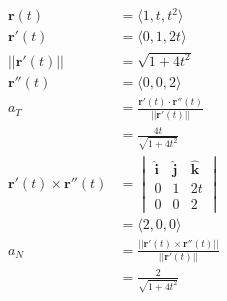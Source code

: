 \documentclass{article}
\begin{document}
\setcounter{subsubsection}{6}
\subsubsection{}

\begin{align*}
  \mathbf{r}(t)                         & = \langle 1, t, t^2 \rangle                                                                  \\
  \mathbf{r}'(t)                        & = \langle 0, 1, 2 t \rangle                                                                  \\
  ||\mathbf{r}'(t)||                    & = \sqrt{1 + 4 t^2}                                                                           \\
  \mathbf{r}''(t)                       & = \langle 0, 0, 2 \rangle                                                                    \\
  a_T                                   & = \frac{\mathbf{r}'(t) \cdot \mathbf{r}''(t)}{||\mathbf{r}'(t)||}                            \\
                                        & = \frac{4 t}{\sqrt{1 + 4 t^2}}                                                               \\
  \mathbf{r}'(t) \times \mathbf{r}''(t) & = \begin{vmatrix}
                                              \hat{\mathbf{i}} & \hat{\mathbf{j}} & \hat{\mathbf{k}} \\
                                              0                & 1                & 2 t              \\
                                              0                & 0                & 2
                                            \end{vmatrix} \\
                                        & = \langle 2, 0, 0 \rangle                                                                    \\
  a_N                                   & = \frac{||\mathbf{r}'(t) \times \mathbf{r}''(t)||}{||\mathbf{r}'(t)||}                       \\
                                        & = \frac{2}{\sqrt{1 + 4 t^2}}
\end{align*}

\setcounter{subsubsection}{16}
\subsubsection{}
\end{document}
